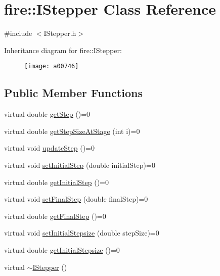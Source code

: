 \hypertarget{a00746}{}\section{fire\+:\+:I\+Stepper Class Reference}
\label{a00746}


{\ttfamily \#include $<$I\+Stepper.\+h$>$}

Inheritance diagram for fire\+:\+:I\+Stepper\+:\begin{figure}[H]
\begin{center}
\leavevmode
\texttt{[image: a00746]}
\end{center}
\end{figure}
\subsection*{Public Member Functions}
\begin{DoxyCompactItemize}
\item 
virtual double \hyperlink{a00746_a7f709d1462a2a3b8bd8214cc681ca26e}{get\+Step} ()=0
\item 
virtual double \hyperlink{a00746_a43027c0c268afcd59db8815c2e2c41ea}{get\+Step\+Size\+At\+Stage} (int i)=0
\item 
virtual void \hyperlink{a00746_a44dfccb90ee5ef6e080b54113c215458}{update\+Step} ()=0
\item 
virtual void \hyperlink{a00746_a3a5099cd0f3c874e56c33cb8f13b8f3b}{set\+Initial\+Step} (double initial\+Step)=0
\item 
virtual double \hyperlink{a00746_a49df3a2ac05cebaf2baf387b66d19272}{get\+Initial\+Step} ()=0
\item 
virtual void \hyperlink{a00746_add76974a7b6fbbc93916270a376c461e}{set\+Final\+Step} (double final\+Step)=0
\item 
virtual double \hyperlink{a00746_ab234d9f032e02668aededf1c22e8c0a9}{get\+Final\+Step} ()=0
\item 
virtual void \hyperlink{a00746_a69c262f248511efcd271be1724a41ad9}{set\+Initial\+Stepsize} (double step\+Size)=0
\item 
virtual double \hyperlink{a00746_afb777e62386b25e5a38d59af54972690}{get\+Initial\+Stepsize} ()=0
\item 
virtual \hyperlink{a00746_ac8ec460d35512e2e039396d5192eb57e}{$\sim$\+I\+Stepper} ()
\end{DoxyCompactItemize}


